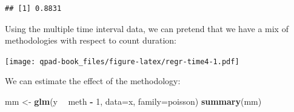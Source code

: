 \documentclass[12pt,]{book}
\newenvironment{Shaded}{\begin{snugshade}}{\end{snugshade}}
\newcommand{\DataTypeTok}[1]{\textcolor[rgb]{0.13,0.29,0.53}{#1}}
\newcommand{\DecValTok}[1]{\textcolor[rgb]{0.00,0.00,0.81}{#1}}
\newcommand{\KeywordTok}[1]{\textcolor[rgb]{0.13,0.29,0.53}{\textbf{#1}}}
\newcommand{\NormalTok}[1]{#1}
\newcommand{\OperatorTok}[1]{\textcolor[rgb]{0.81,0.36,0.00}{\textbf{#1}}}
\newcommand{\OtherTok}[1]{\textcolor[rgb]{0.56,0.35,0.01}{#1}}
\newcommand{\StringTok}[1]{\textcolor[rgb]{0.31,0.60,0.02}{#1}}
\begin{document}
\begin{verbatim}
## [1] 0.8831
\end{verbatim}

Using the multiple time interval data, we can pretend that
we have a mix of methodologies with respect to count duration:

\begin{Shaded}
\end{Shaded}

\texttt{[image: qpad-book\_files/figure-latex/regr-time4-1.pdf]}

We can estimate the effect of the methodology:

\begin{Shaded}
\begin{Highlighting}[]
\NormalTok{mm <-}\StringTok{ }\KeywordTok{glm}\NormalTok{(y }\OperatorTok{~}\StringTok{ }\NormalTok{meth }\OperatorTok{-}\StringTok{ }\DecValTok{1}\NormalTok{, }\DataTypeTok{data=}\NormalTok{x, }\DataTypeTok{family=}\NormalTok{poisson)}
\KeywordTok{summary}\NormalTok{(mm)}
\end{Highlighting}
\end{Shaded}
\end{document}
